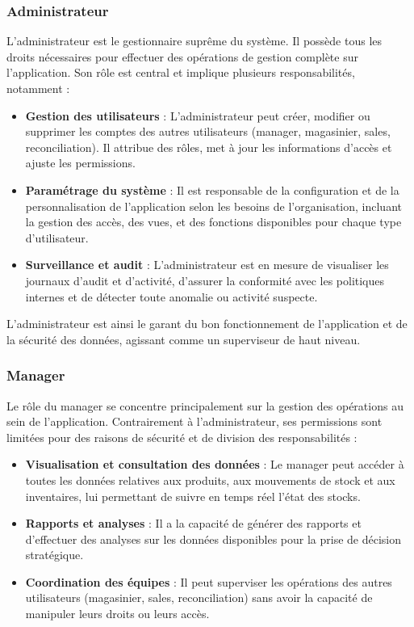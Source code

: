\documentclass[a4paper, oneside, 12pt, final]{extreport}
\begin{document}
\subsubsection{Administrateur}

L'administrateur est le gestionnaire suprême du système. Il possède tous les droits nécessaires pour effectuer des opérations de gestion complète sur l'application. Son rôle est central et implique plusieurs responsabilités, notamment :

\begin{itemize}
    \item \textbf{Gestion des utilisateurs} : L'administrateur peut créer, modifier ou supprimer les comptes des autres utilisateurs (manager, magasinier, sales, reconciliation). Il attribue des rôles, met à jour les informations d'accès et ajuste les permissions.
    \item \textbf{Paramétrage du système} : Il est responsable de la configuration et de la personnalisation de l'application selon les besoins de l'organisation, incluant la gestion des accès, des vues, et des fonctions disponibles pour chaque type d'utilisateur.
    \item \textbf{Surveillance et audit} : L'administrateur est en mesure de visualiser les journaux d'audit et d'activité, d'assurer la conformité avec les politiques internes et de détecter toute anomalie ou activité suspecte.
\end{itemize}

L'administrateur est ainsi le garant du bon fonctionnement de l'application et de la sécurité des données, agissant comme un superviseur de haut niveau.

\subsubsection{Manager}

Le rôle du manager se concentre principalement sur la gestion des opérations au sein de l'application. Contrairement à l'administrateur, ses permissions sont limitées pour des raisons de sécurité et de division des responsabilités :

\begin{itemize}
    \item \textbf{Visualisation et consultation des données} : Le manager peut accéder à toutes les données relatives aux produits, aux mouvements de stock et aux inventaires, lui permettant de suivre en temps réel l'état des stocks.
    \item \textbf{Rapports et analyses} : Il a la capacité de générer des rapports et d'effectuer des analyses sur les données disponibles pour la prise de décision stratégique.
    \item \textbf{Coordination des équipes} : Il peut superviser les opérations des autres utilisateurs (magasinier, sales, reconciliation) sans avoir la capacité de manipuler leurs droits ou leurs accès.
\end{itemize}
\end{document}
